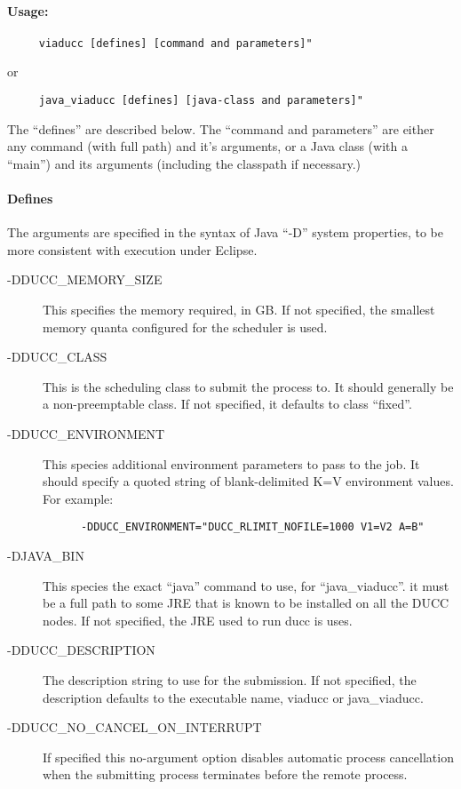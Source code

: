     \paragraph{Usage:}
\begin{verbatim}
     viaducc [defines] [command and parameters]"
\end{verbatim}
     or
\begin{verbatim}
     java_viaducc [defines] [java-class and parameters]"
\end{verbatim}

     The ``defines'' are described below.  The ``command and parameters'' are either any command
     (with full path) and it's arguments, or a Java class (with a ``main'') and its arguments (including
     the classpath if necessary.)

     \paragraph{Defines}

     The arguments are specified in the syntax of Java ``-D'' system properties, to be more consistent
     with execution under Eclipse.
     \begin{description}
         \item[-DDUCC\_MEMORY\_SIZE] This specifies the memory required, in GB.  If not specified, the
           smallest memory quanta configured for the scheduler is used.
         \item[-DDUCC\_CLASS] This is the scheduling class to submit the process to.  It should generally
           be a non-preemptable class.  If not specified, it defaults to class ``fixed''.
         \item[-DDUCC\_ENVIRONMENT] This species additional environment parameters to pass to the job.
           It should specify a quoted string of blank-delimited K=V environment values.  For example:
\begin{verbatim}
      -DDUCC_ENVIRONMENT="DUCC_RLIMIT_NOFILE=1000 V1=V2 A=B"
\end{verbatim}
         \item[-DJAVA\_BIN] This species the exact ``java'' command to use, for ``java\_viaducc''.  it
           must be a full path to some JRE that is known to be installed on all the DUCC nodes.  If not
           specified, the JRE used to run ducc is uses.
         \item[-DDUCC\_DESCRIPTION] The description string to use for the submission.
           If not specified, the description defaults to the executable name, viaducc or java\_viaducc.
         \item[-DDUCC\_NO\_CANCEL\_ON\_INTERRUPT] If specified this no-argument option disables 
           automatic process cancellation when the submitting process terminates before the remote process.
    \end{description}
        
